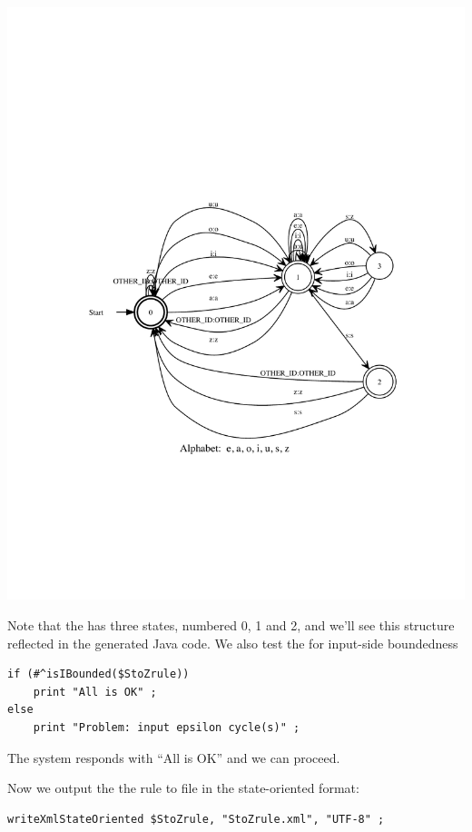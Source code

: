 \begin{center}
\includegraphics[scale=0.9]{images/StoZrule.pdf}
\end{center}


\noindent
Note that the \fsm{} has three states, numbered 0, 1 and 2, and we'll see this structure reflected in the generated Java code.
We also test the \fsm{} for input-side boundedness

\begin{Verbatim}
if (#^isIBounded($StoZrule))
    print "All is OK" ;
else
    print "Problem: input epsilon cycle(s)" ;
\end{Verbatim}

\noindent
The system responds with ``All is OK'' and we can proceed.

Now we output the the rule \fsm{} to file in the state-oriented \xml{} format:

\begin{Verbatim}
writeXmlStateOriented $StoZrule, "StoZrule.xml", "UTF-8" ;
\end{Verbatim}

